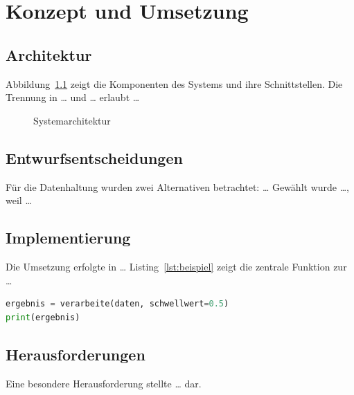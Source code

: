 \chapter{Konzept und Umsetzung}
\label{cha:umsetzung}


\section{Architektur}
\label{sec:architektur}

Abbildung~\ref{fig:architektur} zeigt die Komponenten des Systems und ihre
Schnittstellen. Die Trennung in \ldots{} und \ldots{} erlaubt \ldots

\begin{figure}[htbp]
  \centering
  \caption{Systemarchitektur}
  \label{fig:architektur}
\end{figure}

\section{Entwurfsentscheidungen}
\label{sec:entwurf}

Für die Datenhaltung wurden zwei Alternativen betrachtet: \ldots{} Gewählt wurde
\ldots, weil \ldots

\section{Implementierung}
\label{sec:implementierung}

Die Umsetzung erfolgte in \ldots{} Listing~\ref{lst:beispiel} zeigt die zentrale
Funktion zur \ldots



\begin{lstlisting}[language=Python, caption={Aufruf der Funktion}, label={lst:aufruf}]
ergebnis = verarbeite(daten, schwellwert=0.5)
print(ergebnis)
\end{lstlisting}

\section{Herausforderungen}
\label{sec:herausforderungen}

Eine besondere Herausforderung stellte \ldots{} dar. 
